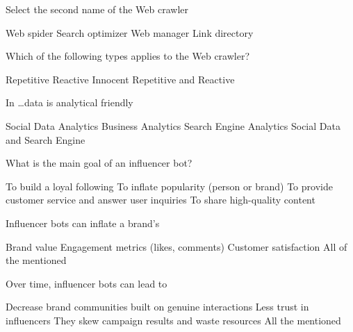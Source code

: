 \documentclass[theme=sleek, randomorder, hidesidemenu]{webquiz}
\begin{document}
\begin{question}
  Select the second name of the Web crawler
  \begin{choice}[columns=2]
    \correct Web spider
    \incorrect Search optimizer
    \incorrect Web manager
    \incorrect Link directory
  \end{choice}
\end{question}

\begin{question}
  Which of the following types applies to the Web crawler?
  \begin{choice}[columns=2]
    \incorrect Repetitive
    \incorrect Reactive
    \correct Innocent
    \incorrect Repetitive and Reactive
  \end{choice}
\end{question}

\begin{question}
  In \ldots data is analytical friendly
  \begin{choice}[columns=2]
    \incorrect Social Data Analytics
    \correct Business Analytics
    \incorrect Search Engine Analytics
    \incorrect Social Data and Search Engine
  \end{choice}
\end{question}

\begin{question}
  What is the main goal of an influencer bot?
  \begin{choice}[columns=2]
    \incorrect To build a loyal following
    \correct To inflate popularity (person or brand)
    \incorrect To provide customer service and answer user inquiries
    \incorrect To share high-quality content
  \end{choice}
\end{question}

\begin{question}
  Influencer bots can inflate a brand's
  \begin{choice}[columns=2]
    \incorrect Brand value
    \correct Engagement metrics (likes, comments)
    \incorrect Customer satisfaction
    \incorrect All of the mentioned
  \end{choice}
\end{question}

\begin{question}
 Over time, influencer  bots can lead to
 \begin{choice}[columns=2]
   \incorrect Decrease brand communities built on genuine interactions
   \incorrect Less trust in influencers
   \incorrect They skew campaign results and waste resources
   \correct All the mentioned
 \end{choice}
\end{question}
\end{document}
